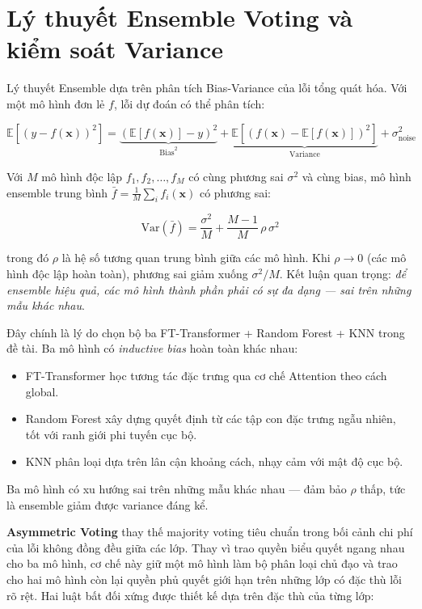 \documentclass[../DoAn.tex]{subfiles}
\begin{document}
\section{Lý thuyết Ensemble Voting và kiểm soát Variance}
\label{sec:pt-ensemble}

Lý thuyết Ensemble dựa trên phân tích Bias-Variance của lỗi tổng quát hóa. Với một mô hình đơn lẻ $f$, lỗi dự đoán có thể phân tích:

\begin{equation}
    \mathbb{E}\!\left[(y - f(\mathbf{x}))^2\right] = \underbrace{\left(\mathbb{E}[f(\mathbf{x})] - y\right)^2}_{\text{Bias}^2} + \underbrace{\mathbb{E}\!\left[(f(\mathbf{x}) - \mathbb{E}[f(\mathbf{x})])^2\right]}_{\text{Variance}} + \sigma^2_{\text{noise}}
    \label{eq:bias-variance}
\end{equation}

Với $M$ mô hình độc lập $f_1, f_2, \ldots, f_M$ có cùng phương sai $\sigma^2$ và cùng bias, mô hình ensemble trung bình $\bar{f} = \frac{1}{M}\sum_i f_i(\mathbf{x})$ có phương sai:

\begin{equation}
    \text{Var}(\bar{f}) = \frac{\sigma^2}{M} + \frac{M-1}{M}\, \rho\, \sigma^2
    \label{eq:ensemble-variance}
\end{equation}

trong đó $\rho$ là hệ số tương quan trung bình giữa các mô hình. Khi $\rho \rightarrow 0$ (các mô hình độc lập hoàn toàn), phương sai giảm xuống $\sigma^2/M$. Kết luận quan trọng: \textit{để ensemble hiệu quả, các mô hình thành phần phải có sự đa dạng --- sai trên những mẫu khác nhau}.

Đây chính là lý do chọn bộ ba FT-Transformer + Random Forest + KNN trong đề tài. Ba mô hình có \textit{inductive bias} hoàn toàn khác nhau:
\begin{itemize}
    \item FT-Transformer học tương tác đặc trưng qua cơ chế Attention theo cách global.
    \item Random Forest xây dựng quyết định từ các tập con đặc trưng ngẫu nhiên, tốt với ranh giới phi tuyến cục bộ.
    \item KNN phân loại dựa trên lân cận khoảng cách, nhạy cảm với mật độ cục bộ.
\end{itemize}

Ba mô hình có xu hướng sai trên những mẫu khác nhau --- đảm bảo $\rho$ thấp, tức là ensemble giảm được variance đáng kể.

\textbf{Asymmetric Voting} thay thế majority voting tiêu chuẩn trong bối cảnh chi phí của lỗi không đồng đều giữa các lớp. Thay vì trao quyền biểu quyết ngang nhau cho ba mô hình, cơ chế này giữ một mô hình làm bộ phân loại chủ đạo và trao cho hai mô hình còn lại quyền phủ quyết giới hạn trên những lớp có đặc thù lỗi rõ rệt. Hai luật bất đối xứng được thiết kế dựa trên đặc thù của từng lớp:
\end{document}
